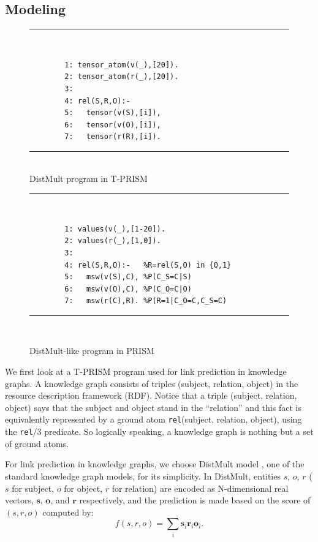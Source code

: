 \documentclass[a4paper]{report}
\newcommand{\mvec}[1]{\mathbf{#1}}
\begin{document}
\subsection*{Modeling}

\begin{figure}[tb]
	\begin{minipage}{0.5\hsize}
		\rule{0.85\textwidth}{0.10mm}\\ [-1em]
		\begin{verbatim}
		1: tensor_atom(v(_),[20]).
		2: tensor_atom(r(_),[20]).
		3:
		4: rel(S,R,O):-
		5:   tensor(v(S),[i]),
		6:   tensor(v(O),[i]),
		7:   tensor(r(R),[i]).
		\end{verbatim}
		\rule{0.85\textwidth}{0.10mm}\\ [-1em]
		\caption{DistMult program in T-PRISM}
		\label{fig:tprism-distmult}
	\end{minipage}
	\begin{minipage}{0.5\hsize}
		\rule{0.85\textwidth}{0.10mm}\\ [-1em]
		\begin{verbatim}
		1: values(v(_),[1-20]).
		2: values(r(_),[1,0]).
		3: 
		4: rel(S,R,O):-   %R=rel(S,O) in {0,1}
		5:   msw(v(S),C), %P(C_S=C|S)
		6:   msw(v(O),C), %P(C_O=C|O)
		7:   msw(r(C),R). %P(R=1|C_O=C,C_S=C)
		\end{verbatim}
		\rule{0.85\textwidth}{0.10mm}\\ [-1em]
		\caption{DistMult-like program in PRISM}
		\label{fig:prism-distmult}
	\end{minipage}
\end{figure}



We  first look  at  a  T-PRISM program  used  for  link prediction  in
knowledge  graphs.  A  knowledge graph  consists of  triples (subject,
relation, object) in the resource description framework (RDF).  Notice
that a  triple (subject, relation,  object) says that the  subject and
object  stand  in  the  ``relation'' and  this  fact  is  equivalently
represented  by a  ground atom  {\tt rel}(subject,  relation, object),
using the {\tt  rel}/3 predicate.  So logically  speaking, a knowledge
graph is nothing but a set of ground atoms.

For  link   prediction  in   knowledge  graphs,  we   choose  DistMult
model \cite{Yang15}, one  of the standard knowledge  graph models, for
its simplicity.  In DistMult, entities $s$, $o$, $r$ ($s$ for subject,
$o$ for  object, $r$ for  relation) are encoded as  N-dimensional real
vectors, $\mvec{s}$, $\mvec{o}$, and  $\mvec{r}$ respectively, and the
prediction is made based on the score of $(s,r,o)$ computed by:
%
\begin{equation}
f(s,r,o)=\sum_i \mvec{s}_i \mvec{r}_i \mvec{o}_i.
\label{eq:distmult}
\end{equation}
\end{document}
